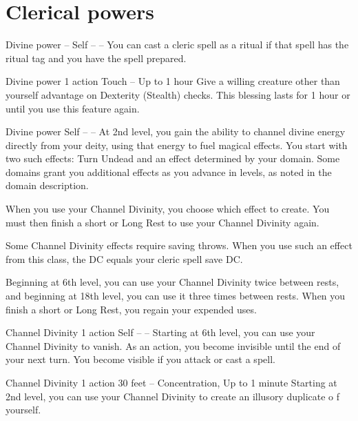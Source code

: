\documentclass[10pt,twoside,twocolumn,openany]{book}
\begin{document}
\renewcommand\labelitemi{$\bullet$}
\chapter{Clerical powers}
{Divine power}
{--}
{Self}
{--}
{--}
%
You can cast a cleric spell as a ritual if that spell has the ritual tag and you have the spell prepared.

{Divine power}
{\color{action} 1 action}
{Touch}
{--}
{Up to 1 hour}
%
Give a willing creature other than yourself advantage on Dexterity (Stealth) checks. This blessing lasts for 1 hour or until you use this feature again.

{Divine power}
{}
{Self}
{--}
{--}
%
At 2nd level, you gain the ability to channel divine energy directly from your deity, using that energy to fuel magical effects. You start with two such effects: Turn Undead and an effect determined by your domain. Some domains grant you additional effects as you advance in levels, as noted in the domain description.

When you use your Channel Divinity, you choose which effect to create. You must then finish a short or Long Rest to use your Channel Divinity again.

Some Channel Divinity effects require saving throws. When you use such an effect from this class, the DC equals your cleric spell save DC.

Beginning at 6th level, you can use your Channel Divinity twice between rests, and beginning at 18th level, you can use it three times between rests. When you finish a short or Long Rest, you regain your expended uses.

{Channel Divinity}
{\color{action} 1 action}
{Self}
{--}
{--}
%
Starting at 6th level, you can use your Channel Divinity to vanish.
As an action, you become invisible until the end of your next turn. You become visible if you attack or cast a spell.

\newpage
{}
{Channel Divinity}
{\color{action} 1 action}
{30 feet}
{--}
{{\color{concentration}Concentration}, Up to 1 minute}
%
Starting at 2nd level, you can use your Channel Divinity to create an illusory duplicate o f yourself.
\end{document}
